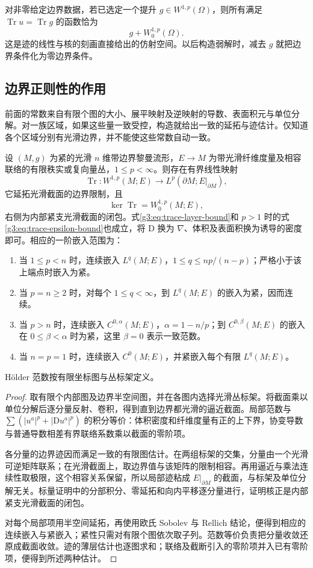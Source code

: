 \ProseParagraphBreak

对非零给定边界数据，若已选定一个提升 \(g\in W^{1,p}(\Omega)\)，则所有满足 \(\operatorname{Tr}u=\operatorname{Tr}g\) 的函数恰为
\[
	g+W_0^{1,p}(\Omega).
\]
这是迹的线性与核的刻画直接给出的仿射空间。以后构造弱解时，减去 \(g\) 就把边界条件化为零边界条件。

\subsection{边界正则性的作用}
\label{g3:subsec:1106:04}
前面的常数来自有限个图的大小、展平映射及逆映射的导数、表面积元与单位分解。对一族区域，如果这些量一致受控，构造就给出一致的延拓与迹估计。仅知道各个区域分别有光滑边界，并不能使这些常数自动一致。

\begin{proposition}\label{g3:prop:sobolev-boundary-bundles}
	设 \((M,g)\) 为紧的光滑 \(n\) 维带边界黎曼流形，\(E\to M\) 为带光滑纤维度量及相容联络的有限秩实或复向量丛，\(1\le p<\infty\)。则存在有界线性映射
	\[
		\operatorname{Tr}:W^{1,p}(M;E)\longrightarrow
		L^p(\partial M;E|_{\partial M}),
	\]
	它延拓光滑截面的边界限制，且
	\[
		\ker\operatorname{Tr}=W_0^{1,p}(M;E),
	\]
	右侧为内部紧支光滑截面的闭包。式\eqref{g3:eq:trace-layer-bound}和 \(p>1\) 时的式\eqref{g3:eq:trace-epsilon-bound}也成立，将 \(\mathrm D\) 换为 \(\nabla\)、体积及表面积换为诱导的密度即可。相应的一阶嵌入范围为：
	\begin{enumerate}
		\item 当 \(1\le p<n\) 时，连续嵌入 \(L^q(M;E)\)，\(1\le q\le np/(n-p)\)；严格小于该上端点时嵌入为紧。
		\item 当 \(p=n\ge2\) 时，对每个 \(1\le q<\infty\)，到 \(L^q(M;E)\) 的嵌入为紧，因而连续。
		\item 当 \(p>n\) 时，连续嵌入 \(C^{0,\alpha}(M;E)\)，\(\alpha=1-n/p\)；到 \(C^{0,\beta}(M;E)\) 的嵌入在 \(0\le\beta<\alpha\) 时为紧，这里 \(\beta=0\) 表示一致范数。
		\item 当 \(n=p=1\) 时，连续嵌入 \(C^0(M;E)\)，并紧嵌入每个有限 \(L^q(M;E)\)。
	\end{enumerate}
	Hölder 范数按有限坐标图与丛标架定义。
\end{proposition}
\begin{proof}
	取有限个内部图及边界半空间图，并在各图内选择光滑丛标架。将截面乘以单位分解后逐分量反射、卷积，得到直到边界都光滑的逼近截面。局部范数与 \(\sum(|u^a|^p+|\mathrm Du^a|^p)\) 的积分等价：体积密度和纤维度量有正的上下界，协变导数与普通导数相差有界联络系数乘以截面的零阶项。

	各分量的边界迹因而满足一致的有限图估计。在两组标架的交集，分量由一个光滑可逆矩阵联系；在光滑截面上，取边界值与该矩阵的限制相容。再用逼近与乘法连续性取极限，这个相容关系保留，所以局部迹粘成 \(E|_{\partial M}\) 的截面，与标架及单位分解无关。标量证明中的分部积分、零延拓和向内平移逐分量进行，证明核正是内部紧支光滑截面的闭包。

	对每个局部项用半空间延拓，再使用欧氏 Sobolev 与 Rellich 结论，便得到相应的连续嵌入与紧嵌入；紧性只需对有限个图依次取子列。范数等价负责把分量收敛还原成截面收敛。迹的薄层估计也逐图求和；联络及截断引入的零阶项并入已有零阶项，便得到所述两种估计。
\end{proof}

